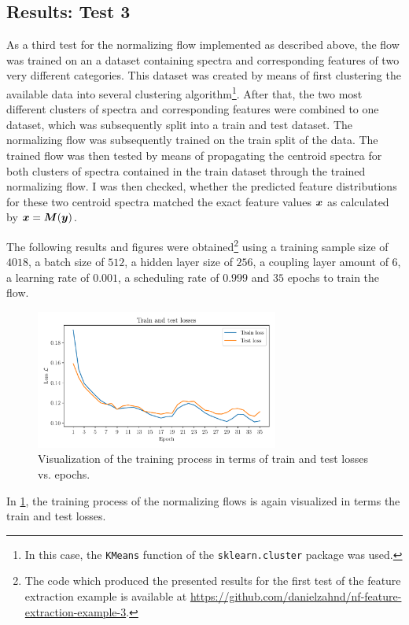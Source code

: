 \documentclass[a4paper,12pt]{report}
\begin{document}
\subsection{Results: Test 3}
As a third test for the normalizing flow implemented as described above, the flow was trained on an a dataset containing spectra and corresponding features of two very different categories. This dataset was created by means of first clustering the available data into several clustering algorithm\cprotect\footnote{In this case, the \verb|KMeans| function of the \verb|sklearn.cluster| package was used.}. After that, the two most different clusters of spectra and corresponding features were combined to one dataset, which was subsequently split into a train and test dataset. The normalizing flow was subsequently trained on the train split of the data. The trained flow was then tested by means of propagating the centroid spectra for both clusters of spectra contained in the train dataset through the trained normalizing flow. I was then checked, whether the predicted feature distributions for these two centroid spectra matched the exact feature values $\bm{x}$ as calculated by $\bm{x} = \bm{M}(\bm{y})$.

The following results and figures were obtained\footnote{The code which produced the presented results for the first test of the feature extraction example is available at \url{https://github.com/danielzahnd/nf-feature-extraction-example-3}.} using a training sample size of $4018$, a batch size of $512$, a hidden layer size of $256$, a coupling layer amount of $6$, a learning rate of $0.001$, a scheduling rate of $0.999$ and $35$ epochs to train the flow.

\begin{figure}[h!]
\centering
\includegraphics[width=8cm]{figures/nf-feature-extraction-example-3-loss.pdf}
\caption{Visualization of the training process in terms of train and test losses vs. epochs.}
\label{fig:nf-feature-extraction-example-3-loss}
\end{figure}
In \cref{fig:nf-feature-extraction-example-3-loss}, the training process of the normalizing flows is again visualized in terms the train and test losses.
\end{document}
